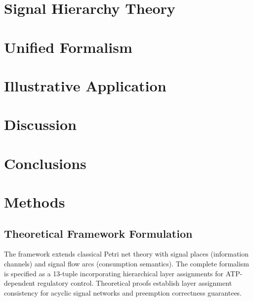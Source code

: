 \documentclass[10pt,letterpaper]{article}
\begin{document}


\section{Signal Hierarchy Theory}



\section{Unified Formalism}



\section{Illustrative Application}
\label{sec:results}



\section{Discussion}
\label{sec:discussion}



\section{Conclusions}



\section{Methods}
\label{sec:methods}

\subsection{Theoretical Framework Formulation}

The framework extends classical Petri net theory with signal places (information channels) and signal flow arcs (consumption semantics). The complete formalism is specified as a 13-tuple incorporating hierarchical layer assignments for ATP-dependent regulatory control. Theoretical proofs establish layer assignment consistency for acyclic signal networks and preemption correctness guarantees.
\end{document}
